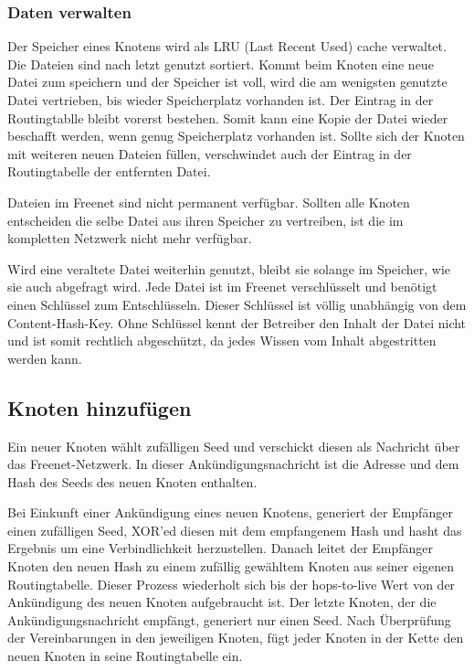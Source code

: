 \subsubsection{Daten verwalten}
Der Speicher eines Knotens wird als LRU (Last Recent Used) cache verwaltet.
Die Dateien sind nach letzt genutzt sortiert. Kommt beim Knoten eine neue Datei
zum speichern und der Speicher ist voll, wird die am wenigsten genutzte Datei
vertrieben, bis wieder Speicherplatz vorhanden ist. Der Eintrag in der
Routingtablle bleibt vorerst bestehen. Somit kann eine Kopie der Datei
wieder beschafft werden, wenn genug Speicherplatz vorhanden ist. Sollte sich
der Knoten mit weiteren neuen Dateien füllen, verschwindet auch der Eintrag
in der Routingtabelle der entfernten Datei.

Dateien im Freenet sind nicht permanent verfügbar. Sollten alle Knoten
entscheiden die selbe Datei aus ihren Speicher zu vertreiben, ist die im
kompletten Netzwerk nicht mehr verfügbar.

Wird eine veraltete Datei weiterhin genutzt, bleibt sie solange im Speicher,
wie sie auch abgefragt wird. Jede Datei ist im Freenet verschlüsselt und
benötigt einen Schlüssel zum Entschlüsseln. Dieser Schlüssel ist völlig
unabhängig von dem Content-Hash-Key.
Ohne Schlüssel kennt der Betreiber den Inhalt der Datei nicht und ist somit
rechtlich abgeschützt, da jedes Wissen vom Inhalt abgestritten werden kann.

\subsection{Knoten hinzufügen}
Ein neuer Knoten wählt zufälligen Seed und verschickt diesen als Nachricht über
das Freenet-Netzwerk. In dieser Ankündigungsnachricht ist die Adresse und dem
Hash des Seeds des neuen Knoten enthalten.

Bei Einkunft einer Ankündigung eines neuen Knotens, generiert der Empfänger
einen zufälligen Seed, XOR'ed diesen mit dem empfangenem Hash und hasht das
Ergebnis um eine Verbindlichkeit herzustellen. Danach leitet der Empfänger
Knoten den neuen Hash zu einem zufällig gewähltem Knoten aus seiner eigenen
Routingtabelle. Dieser Prozess wiederholt sich bis der hops-to-live Wert von
der Ankündigung des neuen Knoten aufgebraucht ist.
Der letzte Knoten, der die Ankündigungsnachricht empfängt, generiert nur einen
Seed.
Nach Überprüfung der Vereinbarungen in den jeweiligen Knoten, fügt jeder Knoten
in der Kette den neuen Knoten in seine Routingtabelle ein.
